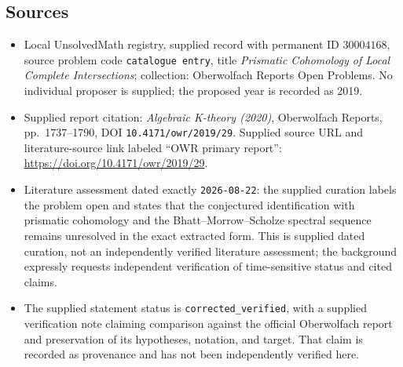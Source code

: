\documentclass[11pt]{article}
\begin{document}
\subsection{Sources}
\begin{itemize}
\item Local UnsolvedMath registry, supplied record with permanent ID \(30004168\), source problem code \texttt{catalogue entry}, title \emph{Prismatic Cohomology of Local Complete Intersections}; collection: Oberwolfach Reports Open Problems. No individual proposer is supplied; the proposed year is recorded as 2019.
\item Supplied report citation: \emph{Algebraic K-theory (2020)}, Oberwolfach Reports, pp.\ 1737--1790, DOI \texttt{10.4171/owr/2019/29}. Supplied source URL and literature-source link labeled ``OWR primary report'': \url{https://doi.org/10.4171/owr/2019/29}.
\item Literature assessment dated exactly \texttt{2026-08-22}: the supplied curation labels the problem open and states that the conjectured identification with prismatic cohomology and the Bhatt--Morrow--Scholze spectral sequence remains unresolved in the exact extracted form. This is supplied dated curation, not an independently verified literature assessment; the background expressly requests independent verification of time-sensitive status and cited claims.
\item The supplied statement status is \texttt{corrected\_verified}, with a supplied verification note claiming comparison against the official Oberwolfach report and preservation of its hypotheses, notation, and target. That claim is recorded as provenance and has not been independently verified here.
\end{itemize}
\end{document}
